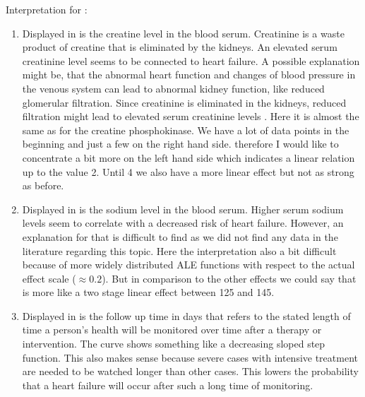\documentclass[11pt,
  a4paper,
  parskip=half, %
  BCOR=10mm, %
  english,
  ]{article}
\begin{document}
Interpretation for :
\begin{enumerate}[label=(\alph*)]
    \item Displayed in  is the creatine level in the blood serum. 
    Creatinine is a waste product of creatine that is eliminated by the kidneys. An elevated serum creatinine level seems to be connected to heart failure. A possible explanation might be, that the abnormal heart function and changes of blood pressure in the venous system can lead to abnormal kidney function, like reduced glomerular filtration. Since creatinine is eliminated in the kidneys, reduced filtration might lead to elevated serum creatinine levels \cite{Srivastava22}.
    Here it is almost the same as for the creatine phosphokinase. We have a lot of data points in the beginning and just a few on the right hand side. therefore I would like to concentrate a bit more on the left hand side which indicates a linear relation up to the value 2. Until 4 we also have a more linear effect but not as strong as before.
    \item Displayed in  is the sodium level in the blood serum. 
    Higher serum sodium levels seem to correlate with a decreased risk of heart failure. However, an explanation for that is difficult to find as we did not find any data in the literature regarding this topic.
    Here the interpretation also a bit difficult because of more widely distributed ALE functions with respect to the actual effect scale ($\approx 0.2$). But in comparison to the other effects we could say that is more like a two stage linear effect between 125 and 145. 
    \item Displayed in  is the follow up time in days that refers to the stated length of time a person's health will be monitored over time after a therapy or intervention. The curve shows something like a decreasing sloped step function. This also makes sense because severe cases with intensive treatment are needed to be watched longer than other cases. This lowers the probability that a heart failure will occur after such a long time of monitoring. 
\end{enumerate}
\end{document}

